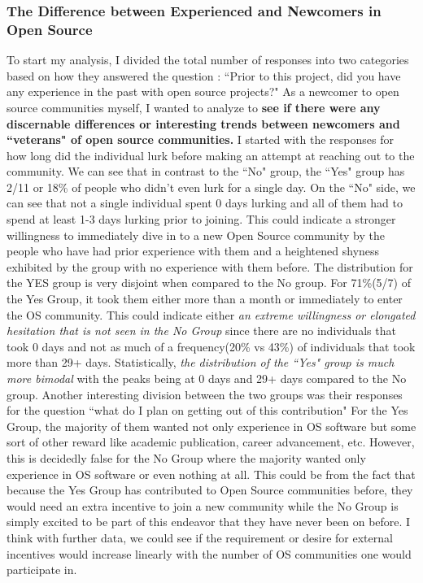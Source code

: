 \subsubsection{The Difference between Experienced and Newcomers in Open Source}

To start my analysis, I divided the total number of responses into two categories based on how they answered the question : ``Prior to this project, did you have any experience in the past with open source projects?"
As a newcomer to open source communities myself, I wanted to analyze to {\bf see if there were any discernable differences or interesting trends between newcomers and ``veterans" of open source communities.} 
I started with the responses for how long did the individual lurk before making an attempt at reaching out to the community. We can see that in contrast to the ``No" group, the ``Yes" group has 2/11 or 18\% of people who didn't even lurk for a single day. On the  ``No" side, we can see that not  a single individual spent 0 days lurking and all of them had to spend at least 1-3 days lurking prior to joining.  This could indicate a stronger willingness to immediately dive in to a new Open Source community by the people who have had prior experience with them and a heightened shyness exhibited by the group with no experience with them before. The distribution for the YES  group is very disjoint when compared to the No group. For 71\%(5/7) of the Yes Group, it took them either more than a month or immediately to enter the OS community. This could indicate either {\it an extreme willingness or elongated hesitation that is not seen in the No Group} since there are no individuals that took 0 days and not as much of a frequency(20\% vs 43\%) of individuals that took more than 29+ days.  Statistically, {\it the distribution of the ``Yes" group is much more bimodal} with the peaks being at 0 days and 29+ days compared to the No group. 
 	Another interesting division between the two groups was their responses for the question ``what do  I plan on getting out of this contribution" For the Yes Group, the majority of them wanted not only experience in OS software but some sort of other reward like academic publication, career advancement, etc. However, this is decidedly false for the No Group where the majority wanted only experience in OS software or even nothing at all. This could be from the fact that because the Yes Group has contributed to Open Source communities before, they would need an extra incentive to join a new community while the No Group is simply excited to be part of this endeavor that they have never been on before. I think with further data, we could see if the requirement or desire for external incentives would increase linearly with the number of OS communities one would participate in.

